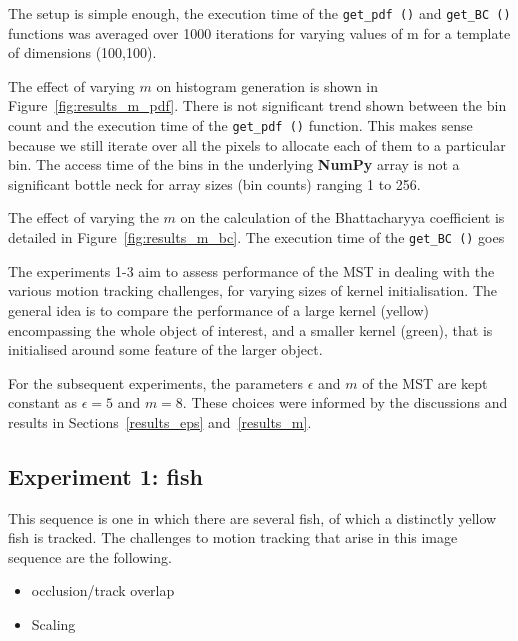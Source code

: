 The setup is simple enough, the execution time of the \lstinline{get_pdf ()} and
\lstinline{get_BC ()} functions was averaged over 1000 iterations for varying
values of m for a template of dimensions (100,100).

The effect of varying $m$ on histogram generation is shown in
Figure~\ref{fig:results_m_pdf}. There is not significant trend shown between the
bin count and the execution time of the \lstinline{get_pdf ()} function. This makes sense
because we still iterate over all the pixels to allocate each of them to a
particular bin. The access time of the bins in the underlying \textbf{NumPy} array is not
a significant bottle neck for array sizes (bin counts) ranging 1 to 256.

The effect of varying the $m$ on the calculation of the Bhattacharyya coefficient is
detailed in Figure~\ref{fig:results_m_bc}. The execution time of the
\lstinline{get_BC ()} goes  



The experiments 1-3 aim to assess performance of the MST in dealing with the
various motion tracking challenges, for varying sizes of kernel initialisation.
The general idea is to compare the performance of a large kernel (yellow)
encompassing the whole object of interest, and a smaller kernel (green), that is
initialised around some feature of the larger object. 

For the subsequent experiments, the parameters $\epsilon$ and $m$ of the MST are
kept constant as $\epsilon=5$ and $m=8$. These choices were informed by the
discussions and results in Sections~\ref{results_eps} and~\ref{results_m}. 

\subsection{Experiment 1: fish}
This sequence is one in which there are several fish, of which a distinctly yellow fish is
tracked. The challenges to motion tracking that arise in this image sequence are the following.
\begin{itemize}
    \item occlusion/track overlap
    \item Scaling 
\end{itemize}

